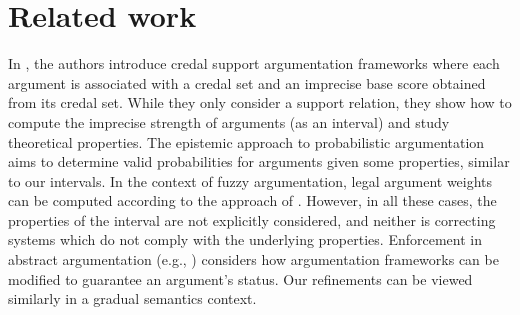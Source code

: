 \section{Related work}
\label{sec:related_worl}

In \cite{DBLP:conf/nmr/EspinozaNT23}, the authors introduce credal support argumentation frameworks where each argument is associated with a credal set and an imprecise base score obtained from its credal set. While they only consider a support relation, they show how to compute the imprecise strength of arguments (as an interval) and study  theoretical properties.
%
The epistemic approach to probabilistic argumentation \cite{hunter21probabilistic} aims to determine valid probabilities for arguments given some properties, similar to our intervals. In the context of fuzzy argumentation, legal argument weights can be computed according to the approach of \cite{DBLP:conf/comma/WuLON16}. However, in all these cases, the properties of the interval are not explicitly considered, and neither is correcting systems which do not comply with the underlying properties.
%
Enforcement in abstract argumentation (e.g., \cite{baumann:hal-03541704}) considers how argumentation frameworks can be modified to guarantee an argument's status. Our refinements can be viewed similarly in a gradual semantics context.